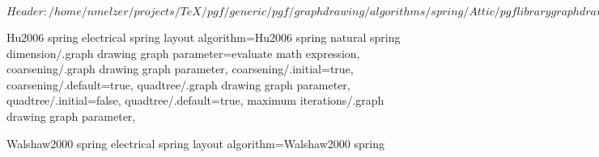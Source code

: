 %
%
%

\ProvidesFileRCS[v\pgfversion] $Header: /home/nmelzer/projects/TeX/pgf/generic/pgf/graphdrawing/algorithms/spring/Attic/pgflibrarygraphdrawing.spring.code.tex,v 1.4 2011/05/09 23:12:50 jannis-pohlmann Exp $





%
% 







%
%



%
% 
%
\pgfgddeclarealgorithmkey
  {Hu2006 spring electrical}
  {spring layout}
  {algorithm=Hu2006 spring}
  {
    natural spring dimension/.graph drawing graph parameter=evaluate math expression,
    coarsening/.graph drawing graph parameter,
    coarsening/.initial=true,
    coarsening/.default=true,
    quadtree/.graph drawing graph parameter,
    quadtree/.initial=false,
    quadtree/.default=true,
    maximum iterations/.graph drawing graph parameter,
  }



%
%
%
\pgfgddeclarealgorithmkey
  {Walshaw2000 spring electrical}
  {spring layout}
  {algorithm=Walshaw2000 spring}
  {}
